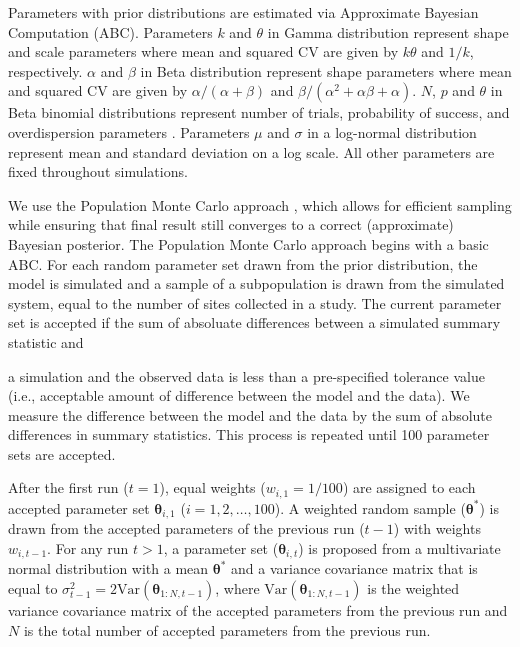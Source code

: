 \documentclass{article}\usepackage[]{graphicx}\usepackage[]{color}
\begin{document}
{\begin{landscape}
\begin{table}[h]
{Parameters with prior distributions are estimated via Approximate Bayesian Computation (ABC).
Parameters $k$ and $\theta$ in Gamma distribution represent shape and scale parameters where mean and squared CV are given by $k \theta$ and $1/k$, respectively.
$\alpha$ and $\beta$ in Beta distribution represent shape parameters where mean and squared CV are given by $\alpha/(\alpha+\beta)$ and $\beta/(\alpha^2 + \alpha \beta + \alpha)$.
$N$, $p$ and $\theta$ in Beta binomial distributions represent number of trials, probability of success, and overdispersion parameters \citep{morris1983natural}.
Parameters $\mu$ and $\sigma$ in a log-normal distribution represent mean and standard deviation on a log scale.
All other parameters are fixed throughout simulations.
}
\label{tb:param}
\end{table}
\end{landscape}
}

We use the Population Monte Carlo approach \citep{turner2012tutorial}, which allows for efficient sampling while ensuring that final result still converges to a correct (approximate) Bayesian posterior.
The Population Monte Carlo approach begins with a basic ABC.
For each random parameter set drawn from the prior distribution, the model is simulated and a sample of a subpopulation is drawn from the simulated system, equal to the number of sites collected in a study.
The current parameter set is accepted if the sum of absoluate differences between a simulated summary statistic and 

a simulation and the observed data is less than a pre-specified tolerance value (i.e., acceptable amount of difference between the model and the data).
We measure the difference between the model and the data by the sum of absolute differences in summary statistics. 
This process is repeated until 100 parameter sets are accepted.

After the first run ($t=1$), equal weights ($w_{i,1}=1/100$) are assigned to each accepted parameter set $\bm\theta_{i, 1}$ ($i = 1, 2, \dots, 100$).
A weighted random sample ($\bm\theta^\ast$) is drawn from the accepted parameters of the previous run ($t-1$) with weights $w_{i,t-1}$.
For any run $t > 1$, a parameter set ($\bm\theta_{i, t}$) is proposed from a multivariate normal distribution with a mean $\bm\theta^\ast$ and a variance covariance matrix that is equal to $\sigma_{t-1}^2=2 \mathrm{Var}(\bm\theta_{1:N, t-1})$, where $\mathrm{Var}(\bm\theta_{1:N, t-1})$ is the weighted variance covariance matrix of the accepted parameters from the previous run and $N$ is the total number of accepted parameters from the previous run.
\end{document}
